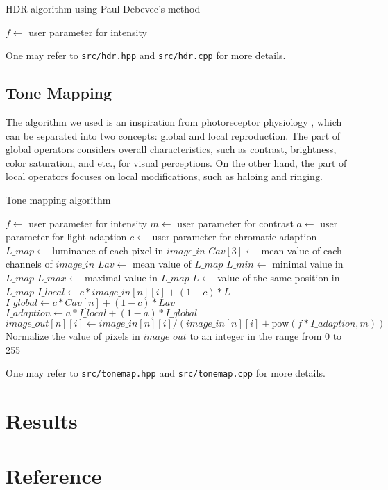 \documentclass[11pt]{article}
\begin{document}
\begin{algorithm}
\caption{HDR algorithm using Paul Debevec's method}
\begin{algorithmic}[1]
\State $f\gets$ user parameter for intensity
\end{algorithmic}
\end{algorithm}

One may refer to \texttt{src/hdr.hpp} and \texttt{src/hdr.cpp} for more details.

\newpage
\subsection{Tone Mapping}
The algorithm we used is an inspiration from photoreceptor physiology \cite{ref:tone-map}, which can be separated into two concepts: global and local reproduction. The part of global operators considers overall characteristics, such as contrast, brightness, color saturation, and etc., for visual perceptions. On the other hand, the part of local operators focuses on local modifications, such as haloing and ringing.

\begin{algorithm}
\caption{Tone mapping algorithm \cite{ref:tone-map}}\label{euclid}
\begin{algorithmic}[1]
\State $f\gets$ user parameter for intensity
\State $m\gets$ user parameter for contrast
\State $a\gets$ user parameter for light adaption 
\State $c\gets$ user parameter for chromatic adaption
\State $L\_map\gets$ luminance of each pixel in $image\_in$
\State $Cav[3]\gets$ mean value of each channels of $image\_in$
\State $Lav\gets$ mean value of $L\_map$
\State $L\_min\gets$ minimal value in $L\_map$
\State $L\_max\gets$ maximal value in $L\_map$
\State $L\gets$ value of the same position in $L\_map$
\State $I\_local\gets c* image\_in[n][i]+ (1-c)*L$
\State $I\_global\gets c*Cav[n]+ (1-c)* Lav$
\State $I\_adaption\gets a*I\_local+(1-a)*I\_global$
\State $image\_out[n][i]\gets image\_in[n][i]/(image\_in[n][i]+\mbox{pow}(f*I\_adaption, m))$
\EndFor
\EndFor
\State Normalize the value of pixels in $image\_out$ to an integer in the range from 0 to 255
\EndFunction
\end{algorithmic}
\end{algorithm}
One may refer to \texttt{src/tonemap.hpp} and \texttt{src/tonemap.cpp} for more details.

\section{Results}

\begin{figure}[!ht]
	\centering
	\label{distort}
\end{figure}

\section{Reference}


\end{document}

